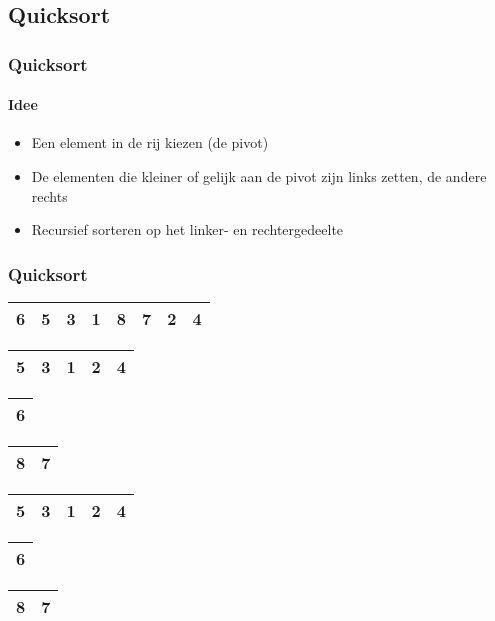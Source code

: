 \subsection[Quick]{Quicksort}

\begin{frame}
\frametitle{Quicksort}
\framesubtitle{Idee}
\begin{itemize}
\item Een element in de rij kiezen (de pivot)
\item De elementen die kleiner of gelijk aan de pivot zijn links zetten, de andere rechts
\item Recursief sorteren op het linker- en rechtergedeelte
\end{itemize}
\end{frame}

\begin{frame}
\frametitle{Quicksort}
\begin{table}
\begin{tabular}{| c | c | c | c | c | c | c | c |}
\hline
\cellcolor{red!25}6 & 5 & 3 & 1 & 8 & 7 & 2 & 4 \\ 
\hline
\end{tabular}
\end{table}

\begin{table}
\begin{tabular}{| c | c | c | c | c |}
\hline
5 & 3 & 1 & 2 & 4 \\ 
\hline
\end{tabular}
\quad
\begin{tabular}{| c |}
\hline
\cellcolor{blue!25}6\\ 
\hline
\end{tabular}
\quad
\begin{tabular}{| c | c |}
\hline
8 & 7 \\ 
\hline
\end{tabular}
\end{table}

\begin{table}
\begin{tabular}{| c | c | c | c | c |}
\hline
\cellcolor{red!25}5 & 3 & 1 & 2 & 4 \\ 
\hline
\end{tabular}
\quad
\begin{tabular}{| c |}
\hline
\cellcolor{blue!25}6\\ 
\hline
\end{tabular}
\quad
\begin{tabular}{| c | c |}
\hline
8 & 7 \\ 
\hline
\end{tabular}
\end{table}


\end{frame}
